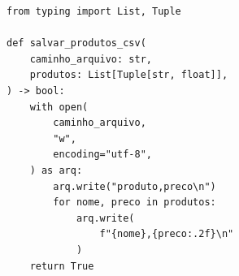\ifmostrarGabarito
\begin{verbatim}
from typing import List, Tuple

def salvar_produtos_csv(
    caminho_arquivo: str,
    produtos: List[Tuple[str, float]],
) -> bool:
    with open(
        caminho_arquivo,
        "w",
        encoding="utf-8",
    ) as arq:
        arq.write("produto,preco\n")
        for nome, preco in produtos:
            arq.write(
                f"{nome},{preco:.2f}\n"
            )
    return True
\end{verbatim}

\fi
